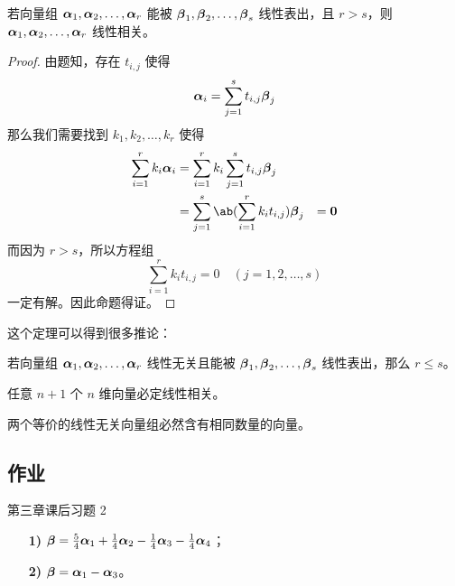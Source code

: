 \begin{theorem}
	若向量组 $\boldsymbol{\alpha}_1, \boldsymbol{\alpha}_2, \dots, \boldsymbol{\alpha}_r$ 能被 $\boldsymbol{\beta}_1, \boldsymbol{\beta}_2, \dots, \boldsymbol{\beta}_s$ 线性表出，且 $r>s$，则 $\boldsymbol{\alpha}_1, \boldsymbol{\alpha}_2, \dots, \boldsymbol{\alpha}_r$ 线性相关。

	\begin{proof}
		由题知，存在 $t_{i,j}$ 使得
		$$
		\boldsymbol{\alpha}_i = \sum_{j=1}^s t_{i,j} \boldsymbol{\beta}_j
		$$
		那么我们需要找到 $k_1, k_2, \dots, k_r$ 使得
		$$
		\begin{aligned}
			\sum_{i=1}^r k_i\vect{\alpha}_i
			& = \sum_{i=1}^r k_i \sum_{j=1}^s t_{i,j} \vect{\beta}_j \\
			& = \sum_{j=1}^s \ab(\sum_{i=1}^r k_i t_{i,j}) \vect{\beta}_j & = \vect{0} \\
		\end{aligned}
		$$
		而因为 $r>s$，所以方程组
		$$
		\sum_{i=1}^r k_i t_{i,j} = 0 \quad (j=1,2,\dots,s)
		$$
		一定有解。因此命题得证。
	\end{proof}
\end{theorem}

这个定理可以得到很多推论：

\begin{corollary}
	若向量组 $\boldsymbol{\alpha}_1, \boldsymbol{\alpha}_2, \dots, \boldsymbol{\alpha}_r$ 线性无关且能被 $\boldsymbol{\beta}_1, \boldsymbol{\beta}_2, \dots, \boldsymbol{\beta}_s$ 线性表出，那么 $r \le s$。
\end{corollary}

\begin{corollary}
	任意 $n+1$ 个 $n$ 维向量必定线性相关。
\end{corollary}

\begin{corollary}
	两个等价的线性无关向量组必然含有相同数量的向量。
\end{corollary}

\subsection{作业}

\begin{problem}
	第三章课后习题 2
	\begin{solution}
		\begin{enumerate}
			\item[\textbf{1)}] $\boldsymbol{\beta} = \frac{5}{4}\boldsymbol{\alpha}_1 + \frac{1}{4}\boldsymbol{\alpha}_2 - \frac{1}{4}\boldsymbol{\alpha}_3 - \frac{1}{4}\boldsymbol{\alpha}_4$；
			\item[\textbf{2)}] $\boldsymbol{\beta} = \boldsymbol{\alpha}_1 - \boldsymbol{\alpha}_3$。
		\end{enumerate}
	\end{solution}
\end{problem}

